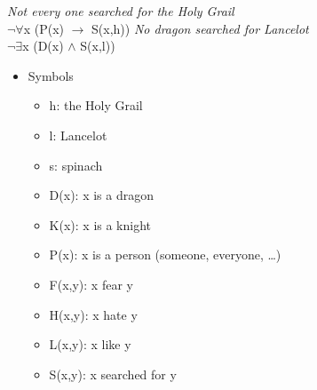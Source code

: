 \documentclass[a4paper]{article}
\newcommand{\into}{\ensuremath{\rightarrow}}
\begin{document}
\begin{enumerate}
\begin{exe}
    \ex \textit{Not every one searched for the Holy Grail} \\
    $\neg\forall$x (P(x)  $\into$ S(x,h))
    \ex \textit{No dragon searched for Lancelot}
\\
    $\neg\exists$x (D(x)  $\wedge$ S(x,l))
  \end{exe}
  \begin{itemize}
  \item Symbols
  \begin{itemize}
  \item h: the Holy Grail 
  \item l: Lancelot
  \item s: spinach
  \item D(x): x is a dragon
  \item K(x): x is a knight
  \item P(x): x is a person (someone, everyone, \ldots)
  \item F(x,y): x fear y
  \item H(x,y): x hate y
  \item L(x,y): x like y
  \item S(x,y): x searched for y
  \end{itemize}
\end{itemize}
\end{enumerate}
\end{document}
